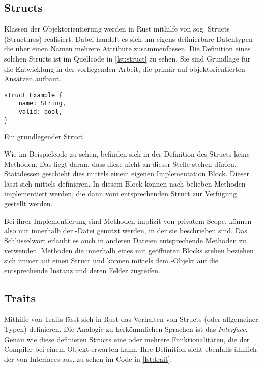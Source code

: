 \subsection{Structs}

Klassen der Objektorientierung werden in Rust mithilfe von sog. \glqq Structs\grqq{} (Structures) realisiert. Dabei handelt es sich um eigens definierbare Datentypen die über einen Namen mehrere Attribute zusammenfassen. Die Definition eines solchen Structs ist im Quellcode in \ref{lst:struct} zu sehen. Sie sind Grundlage für die Entwicklung in der vorliegenden Arbeit, die primär auf objektorientierten Ansätzen aufbaut.

\begin{listing}[th]
\begin{verbatim}
struct Example {
	name: String,
	valid: bool,
}
\end{verbatim}
\label{lst:struct}
\caption{Ein grundlegender Struct}
\end{listing}

Wie im Beispielcode zu sehen, befinden sich in der Definition des Structs  keine Methoden. Das liegt daran, dass diese nicht an dieser Stelle stehen dürfen. Stattdessen geschieht dies mittels einem eigenen \glqq Implementation Block\grqq. Dieser lässt sich mittels  definieren. In diesem Block können nach belieben Methoden implementiert werden, die dann vom entsprechenden Struct zur Verfügung gestellt werden. 

Bei ihrer Implementierung sind Methoden implizit von privatem Scope, können also nur innerhalb der -Datei genutzt werden, in der sie beschrieben sind. Das Schlüsselwort  erlaubt es auch in anderen Dateien entsprechende Methoden zu verwenden. Methoden die innerhalb eines mit  geöffneten Blocks stehen beziehen sich immer auf einen Struct und können mittels dem -Objekt auf die entsprechende Instanz und deren Felder zugreifen.

\subsection{Traits}

Mithilfe von Traits lässt sich in Rust das Verhalten von Structs (oder allgemeiner: Typen) definieren. Die Analogie zu herkömmlichen Sprachen ist das \textit{Interface}. Genau wie diese definieren Structs eine oder mehrere Funktionalitäten, die der Compiler bei einem Objekt erwarten kann. Ihre Definition sieht ebenfalls ähnlich der von Interfaces aus, zu sehen im Code in \ref{lst:trait}.

